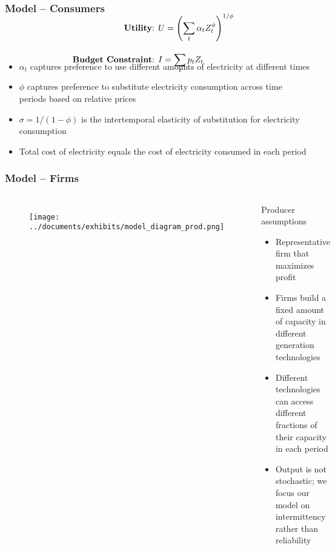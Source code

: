 \documentclass[aspectratio=169]{beamer}
\begin{document}
\begin{frame}
\frametitle{Model -- Consumers}


\vspace{1em}
\begin{block}{}
	\small
	\begin{align*}
	\\[-3em] \text{\textbf{Utility}: } &U = \left( \sum_t \alpha_t Z_t^\phi  \right)^{1/\phi} \\[1em]
	\text{\textbf{Budget Constraint}: } &I = \sum_t p_t Z_t \\[-2.5em]
	\end{align*}
\end{block}

\begin{itemize}
	\setlength\itemsep{0.25em}
	\small
	\item $\alpha_t$ captures preference to use different amounts of electricity at different times
	\item $\phi$ captures preference to substitute electricity consumption across time periods based on relative prices
	\item  $\sigma = 1/(1-\phi)$ is the intertemporal elasticity of substitution for electricity consumption
	\item Total cost of electricity equals the cost of electricity consumed in each period
\end{itemize}

\end{frame}



\begin{frame}
\frametitle{Model -- Firms}


\begin{columns}[T]%
	
	\begin{figure}
		\texttt{[image: ../documents/exhibits/model\_diagram\_prod.png]} 
	\end{figure}
	
	\begin{block}{Producer assumptions}
		\begin{itemize}
			\setlength\itemsep{0.25em}
			\item Representative firm that maximizes profit
			\item Firms build a fixed amount of capacity in different generation technologies
			\item Different technologies can access different fractions of their capacity in each period
			\item Output is not stochastic; we focus our model on intermittency rather than reliability
		\end{itemize}
	\end{block}
		
\end{columns}




\end{frame}
\end{document}
